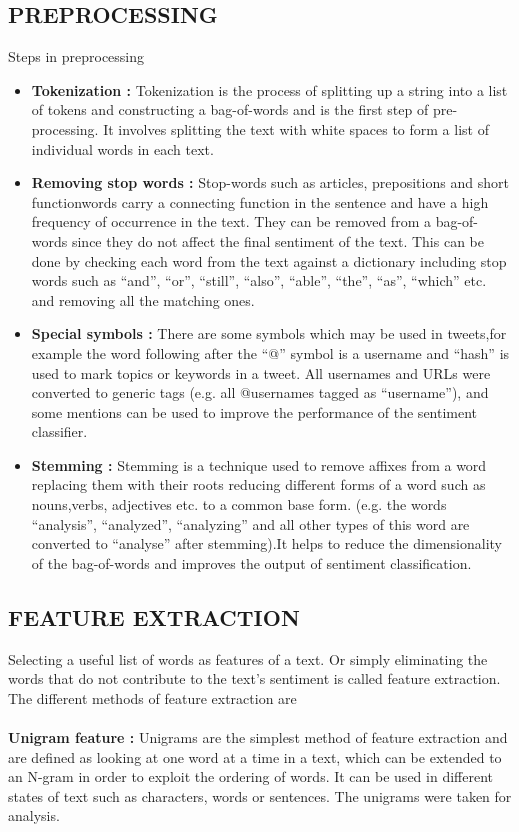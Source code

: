 \subsection{PREPROCESSING}
Steps in preprocessing
\begin{itemize}
	\item{\textbf{Tokenization :}} Tokenization is the process of splitting up a string into a list of tokens and constructing a bag-of-words and is the first step of pre-processing. It involves splitting the text with white spaces to form a list of individual words in each text.
	
	\item{\textbf{Removing stop words :}} Stop-words such as articles, prepositions and short functionwords carry a connecting function in the sentence and have a high frequency of occurrence in the text. They can be removed from a bag-of-words since they do not affect the final sentiment of the text. This can be done by checking each word from the text against a dictionary including stop words such as “and”, “or”, “still”, “also”, “able”, “the”, “as”, “which” etc. and removing all the matching ones.
	
	\item{\textbf{Special symbols :}}  There are some symbols which may be used in tweets,for example the word following after the “@” symbol is a username and “hash” is used to mark topics
	or keywords in a tweet. All usernames and URLs were converted to generic tags (e.g. all @usernames tagged as “username”), and some mentions can be used to improve the performance of the sentiment classifier.
	
	\item{\textbf{Stemming :}}	Stemming is a technique used to remove affixes from a word replacing them with their roots reducing different forms of a word such as nouns,verbs, adjectives etc. to a common base form. (e.g. the words “analysis”, “analyzed”, “analyzing” and all other types of this word are converted to “analyse” after stemming).It helps to reduce the dimensionality of the bag-of-words and improves the output of sentiment classification.
	
\end{itemize}
\subsection{FEATURE EXTRACTION}
Selecting a useful list of words as features of a text. Or simply eliminating the words
that do not contribute to the text’s sentiment is called feature extraction. \\
The different methods of feature extraction are \\ \\
\textbf{Unigram feature :} Unigrams are the simplest method of feature extraction and
are defined as looking at one word at a time in a text, which can be extended to an
N-gram in order to exploit the ordering of words. It can be used in different states
of text such as characters, words or sentences. The unigrams were taken for analysis.

